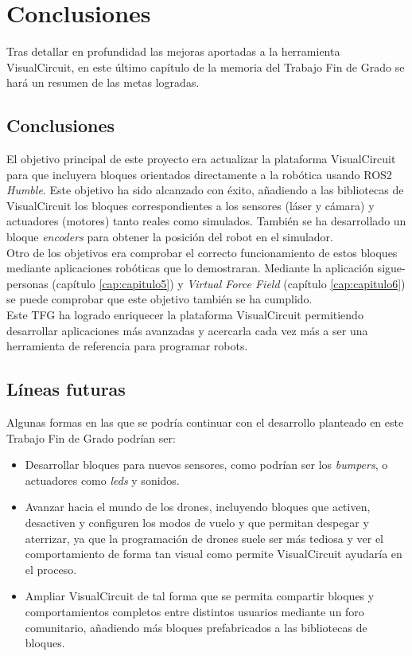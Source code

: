 \chapter{Conclusiones}
\label{cap:capitulo7}

Tras detallar en profundidad las mejoras aportadas a la herramienta VisualCircuit, en este último capítulo de la memoria del
Trabajo Fin de Grado se hará un resumen de las metas logradas.

\section{Conclusiones}

El objetivo principal de este proyecto era actualizar la plataforma VisualCircuit para que incluyera bloques orientados directamente a
la robótica usando ROS2 \textit{Humble}. Este objetivo ha sido alcanzado con éxito, añadiendo a las bibliotecas de VisualCircuit los bloques
correspondientes a los sensores (láser y cámara) y actuadores (motores) tanto reales como simulados.
También se ha desarrollado un bloque \textit{encoders} para obtener la posición del robot en el simulador.\\

Otro de los objetivos era comprobar el correcto funcionamiento de estos bloques mediante aplicaciones robóticas que lo demostraran. Mediante la aplicación
sigue-personas (capítulo \ref{cap:capitulo5}) y \textit{Virtual Force Field} (capítulo \ref{cap:capitulo6}) se puede
comprobar que este objetivo también se ha cumplido.\\

Este TFG ha logrado enriquecer la plataforma VisualCircuit permitiendo desarrollar aplicaciones más avanzadas y acercarla cada vez más a
ser una herramienta de referencia para programar robots.

\newpage

\section{Líneas futuras}

Algunas formas en las que se podría continuar con el desarrollo planteado en este Trabajo Fin de Grado podrían ser:

\begin{itemize}
	\item   Desarrollar bloques para nuevos sensores, como podrían ser los \textit{bumpers}, o actuadores como \textit{leds} y sonidos.
	\item   Avanzar hacia el mundo de los drones, incluyendo bloques que activen, desactiven y configuren los modos de vuelo y que
                permitan despegar y aterrizar, ya que la programación de drones suele ser más tediosa y ver el comportamiento
                de forma tan visual como permite VisualCircuit ayudaría en el proceso.
	\item   Ampliar VisualCircuit de tal forma que se permita compartir bloques y comportamientos completos entre distintos usuarios
                mediante un foro comunitario, añadiendo más bloques prefabricados a las bibliotecas de bloques.
\end{itemize}
